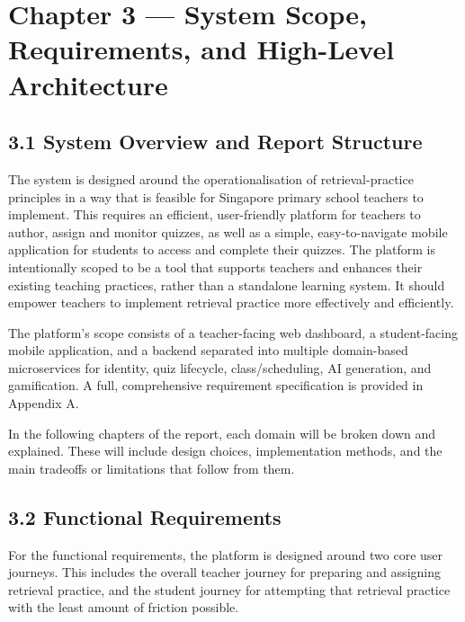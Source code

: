 \documentclass[
  12pt,
  a4paper,
]{report}
\begin{document}
\hypertarget{chapter-3-system-scope-requirements-and-high-level-architecture}{%
\chapter{Chapter 3 --- System Scope, Requirements, and High-Level
Architecture}\label{chapter-3-system-scope-requirements-and-high-level-architecture}}

\hypertarget{system-overview-and-report-structure}{%
\section{3.1 System Overview and Report
Structure}\label{system-overview-and-report-structure}}

The system is designed around the operationalisation of
retrieval-practice principles in a way that is feasible for Singapore
primary school teachers to implement. This requires an efficient,
user-friendly platform for teachers to author, assign and monitor
quizzes, as well as a simple, easy-to-navigate mobile application for
students to access and complete their quizzes. The platform is
intentionally scoped to be a tool that supports teachers and enhances
their existing teaching practices, rather than a standalone learning
system. It should empower teachers to implement retrieval practice more
effectively and efficiently.

The platform's scope consists of a teacher-facing web dashboard, a
student-facing mobile application, and a backend separated into multiple
domain-based microservices for identity, quiz lifecycle,
class/scheduling, AI generation, and gamification. A full, comprehensive
requirement specification is provided in Appendix A.

In the following chapters of the report, each domain will be broken down
and explained. These will include design choices, implementation
methods, and the main tradeoffs or limitations that follow from them.

\hypertarget{functional-requirements}{%
\section{3.2 Functional Requirements}\label{functional-requirements}}

For the functional requirements, the platform is designed around two core user
journeys. This includes the overall teacher journey for preparing and assigning
retrieval practice, and the student journey for attempting that retrieval practice
with the least amount of friction possible.
\end{document}
